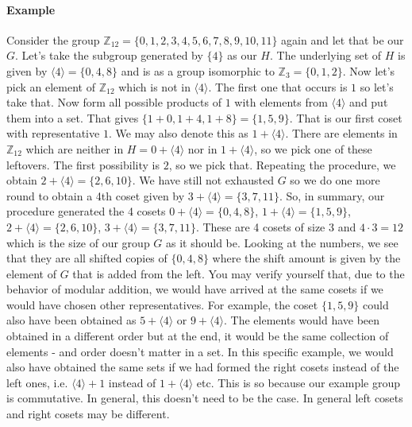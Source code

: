 \paragraph{Example}
Consider the group $\mathbb{Z}_{12} = \{0,1,2,3,4,5,6,7,8,9,10,11\}$ again and let that be our $G$. Let's take the subgroup generated by $\{4\}$ as our $H$. The underlying set of $H$ is given by $\langle 4 \rangle = \{0,4,8\}$ and is as a group isomorphic to $\mathbb{Z}_{3} = \{0,1,2\}$. Now let's pick an element of $\mathbb{Z}_{12}$ which is not in $\langle 4 \rangle$. The first one that occurs is $1$ so let's take that. Now form all possible products of $1$ with elements from $\langle 4 \rangle$ and put them into a set. That gives $\{1+0,1+4,1+8\} = \{1,5,9\}$. That is our first coset with representative $1$. We may also denote this as $1 + \langle 4 \rangle$. There are elements in $\mathbb{Z}_{12}$ which are neither in $H = 0 + \langle 4 \rangle$ nor in $1 + \langle 4 \rangle$, so we pick one of these leftovers. The first possibility is $2$, so we pick that. Repeating the procedure, we obtain $2 + \langle 4 \rangle = \{2,6,10\}$. We have still not exhausted $G$ so we do one more round to obtain a 4th coset given by $3 + \langle 4 \rangle = \{3,7,11\}$. So, in summary, our procedure generated the 4 cosets $0 + \langle 4 \rangle = \{0,4,8\}$, $1 + \langle 4 \rangle = \{1,5,9\}$, $2 + \langle 4 \rangle = \{2,6,10\}$, $3 + \langle 4 \rangle = \{3,7,11\}$. These are 4 cosets of size 3 and $4 \cdot 3 = 12$ which is the size of our group $G$ as it should be. Looking at the numbers, we see that they are all shifted copies of $\{0,4,8\}$ where the shift amount is given by the element of $G$ that is added from the left. You may verify yourself that, due to the behavior of modular addition, we would have arrived at the same cosets if we would have chosen other representatives. For example, the coset $\{1,5,9\}$ could also have been obtained as $5 + \langle 4 \rangle$ or $9 + \langle 4 \rangle$. The elements would have been obtained in a different order but at the end, it would be the same collection of elements - and order doesn't matter in a set. In this specific example, we would also have obtained the same sets if we had formed the right cosets instead of the left ones, i.e. $\langle 4 \rangle + 1$ instead of $1 + \langle 4 \rangle$ etc. This is so because our example group is commutative. In general, this doesn't need to be the case. In general left cosets and right cosets may be different.

